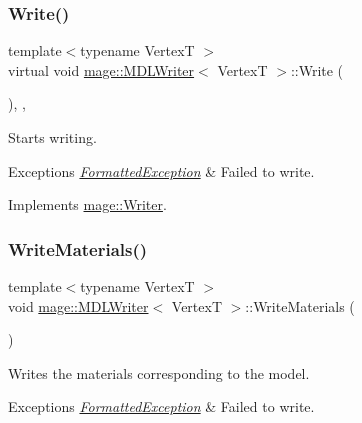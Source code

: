\subsubsection{\texorpdfstring{Write()}{Write()}}
{\footnotesize\ttfamily template$<$typename VertexT $>$ \\
virtual void \hyperlink{classmage_1_1_m_d_l_writer}{mage\+::\+M\+D\+L\+Writer}$<$ VertexT $>$\+::Write (\begin{DoxyParamCaption}{ }\end{DoxyParamCaption})\hspace{0.3cm}{\ttfamily [override]}, {\ttfamily [private]}, {\ttfamily [virtual]}}

Starts writing.


\begin{DoxyExceptions}{Exceptions}
{\em \hyperlink{classmage_1_1_formatted_exception}{Formatted\+Exception}} & Failed to write. \\
\hline
\end{DoxyExceptions}


Implements \hyperlink{classmage_1_1_writer_a9baf695ef7f6180bef883f60bcb3ac07}{mage\+::\+Writer}.

\hypertarget{classmage_1_1_m_d_l_writer_af9416c1b2599ea86f4af8018dc0b9baf}{}\label{classmage_1_1_m_d_l_writer_af9416c1b2599ea86f4af8018dc0b9baf} 
\subsubsection{\texorpdfstring{Write\+Materials()}{WriteMaterials()}}
{\footnotesize\ttfamily template$<$typename VertexT $>$ \\
void \hyperlink{classmage_1_1_m_d_l_writer}{mage\+::\+M\+D\+L\+Writer}$<$ VertexT $>$\+::Write\+Materials (\begin{DoxyParamCaption}{ }\end{DoxyParamCaption})\hspace{0.3cm}{\ttfamily [private]}}

Writes the materials corresponding to the model.


\begin{DoxyExceptions}{Exceptions}
{\em \hyperlink{classmage_1_1_formatted_exception}{Formatted\+Exception}} & Failed to write. \\
\hline
\end{DoxyExceptions}
\hypertarget{classmage_1_1_m_d_l_writer_a3db84a4600cb777b37c666166a631689}{}\label{classmage_1_1_m_d_l_writer_a3db84a4600cb777b37c666166a631689} 
